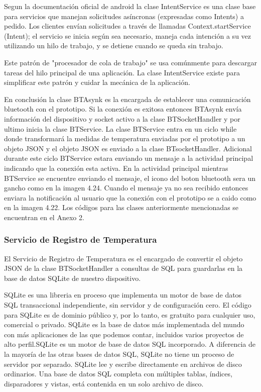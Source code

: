 \par \noindent
Segun la documentación oficial de android la clase IntentService es una clase base para servicios que manejan solicitudes asíncronas (expresadas como Intents) a pedido. Los clientes envían solicitudes a través de llamadas Context.startService (Intent); el servicio se inicia según sea necesario, maneja cada intención a su vez utilizando un hilo de trabajo, y se detiene cuando se queda sin trabajo.\cite{intentservice}

\par \noindent
Este patrón de "procesador de cola de trabajo" se usa comúnmente para descargar tareas del hilo principal de una aplicación. La clase IntentService existe para simplificar este patrón y cuidar la mecánica de la aplicación. \cite{intentservice}

\par \noindent
En conclusión la clase BTAsynk es la encargada de establecer una comunicación bluetooth con el prototipo. Si la conexión es exitosa entonces BTAsynk envía información del dispositivo y socket activo a la clase BTSocketHandler y por ultimo inicia la clase BTService. La clase BTService entra en un ciclo while donde transformará la medidas de temperatura enviadas por el prototipo a un objeto JSON y el objeto JSON es enviado a la clase BTsocketHandler. Adicional durante este ciclo BTService estara enviando un mensaje a la actividad principal indicando que la conexión esta activa. En la actividad principal mientras BTService se encuentre enviando el mensaje, el icono del boton bluetooth sera un gancho como en la imagen 4.24. Cuando el mensaje ya no sea recibido entonces enviara la notificación al usuario que la conexión con el prototipo se a caido como en la imagen 4.22. Los códigos para las clases anteriormente mencionadas se encuentran en el Anexo 2.

\subsubsection{Servicio de Registro de Temperatura}

\par 
El Servicio de Registro de Temperatura es el encargado de convertir el objeto JSON de la clase BTSocketHandler a consultas de SQL para guardarlas en la base de datos SQLite de nuestro dispositivo.

\par \noindent
SQLite es una libreria en proceso que implementa un motor de base de datos SQL transaccional independiente, sin servidor y de configuración cero. El código para SQLite es de dominio público y, por lo tanto, es gratuito para cualquier uso, comercial o privado. SQLite es la base de datos más implementada del mundo con más aplicaciones de las que podemos contar, incluidos varios proyectos de alto perfil.SQLite es un motor de base de datos SQL incorporado. A diferencia de la mayoría de las otras bases de datos SQL, SQLite no tiene un proceso de servidor por separado. SQLite lee y escribe directamente en archivos de disco ordinarios. Una base de datos SQL completa con múltiples tablas, índices, disparadores y vistas, está contenida en un solo archivo de disco.\cite{sqlite}

